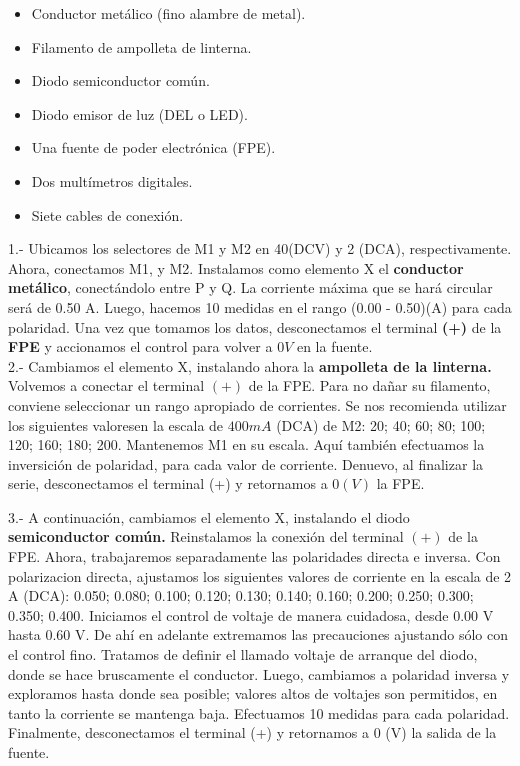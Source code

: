 \documentclass[]{article}
\begin{document}
\begin{multicols*}{2}
  \begin{itemize}
    \item Conductor metálico (fino alambre de metal).
    \item Filamento de ampolleta de linterna.
    \item Diodo semiconductor común.
    \item Diodo emisor de luz (DEL o LED).
    \item Una fuente de poder electrónica (FPE).
    \item Dos multímetros digitales.
    \item Siete cables de conexión.
  \end{itemize}
\end{multicols*}

1.- Ubicamos los selectores de M1 y M2 en 40(DCV) y 2 (DCA), respectivamente. Ahora, conectamos M1, y M2.
Instalamos como elemento X el \textbf{conductor metálico}, conectándolo entre P y Q. La corriente máxima que 
se hará circular será de 0.50 A. 
Luego, hacemos 10 medidas en el rango (0.00 - 0.50)(A) para cada polaridad. Una vez que tomamos los datos, desconectamos
el terminal \textbf{(+)} de la \textbf{FPE} y accionamos el control para volver a $0 V$ en la fuente. \\


2.- Cambiamos el elemento X, instalando ahora la \textbf{ampolleta de la linterna.} Volvemos a conectar el terminal $(+)$ de la FPE. 
Para no dañar su filamento, conviene seleccionar un rango apropiado de corrientes. Se nos recomienda utilizar los
siguientes valoresen la escala de $400 mA$ (DCA) de M2: 20; 40; 60; 80; 100; 120; 160; 180; 200. Mantenemos M1 en 
su escala. Aquí también efectuamos la inversición de polaridad, para cada valor de corriente. Denuevo, al finalizar la serie,
desconectamos el terminal (+) y retornamos a $0 (V)$ la FPE.

3.- A continuación, cambiamos el elemento X, instalando el diodo \textbf{semiconductor común.} Reinstalamos la conexión
del terminal $(+)$ de la FPE. Ahora, trabajaremos separadamente las polaridades directa e inversa. Con polarizacion directa,
ajustamos los siguientes valores de corriente en la escala de 2 A (DCA): 0.050; 0.080; 0.100; 0.120; 0.130;
0.140; 0.160; 0.200; 0.250; 0.300; 0.350; 0.400. Iniciamos el control de voltaje de manera cuidadosa, desde 0.00 V hasta
0.60 V. De ahí en adelante extremamos las precauciones ajustando sólo con el control fino. Tratamos de definir el llamado
voltaje de arranque del diodo, donde se hace bruscamente el conductor. Luego, cambiamos a polaridad inversa
y exploramos hasta donde sea posible; valores altos de voltajes son permitidos, en tanto la corriente se mantenga baja. Efectuamos 10 
medidas para cada polaridad. Finalmente, desconectamos el terminal (+) y retornamos a 0 (V) la salida de la fuente.
\end{document}
